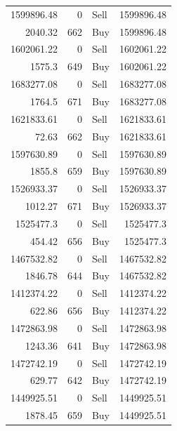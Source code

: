 \begin{longtable}{rrlr}
1599896.48 & 0 & Sell & 1599896.48 \\
2040.32 & 662 & Buy & 1599896.48 \\
1602061.22 & 0 & Sell & 1602061.22 \\
1575.3 & 649 & Buy & 1602061.22 \\
1683277.08 & 0 & Sell & 1683277.08 \\
1764.5 & 671 & Buy & 1683277.08 \\
1621833.61 & 0 & Sell & 1621833.61 \\
72.63 & 662 & Buy & 1621833.61 \\
1597630.89 & 0 & Sell & 1597630.89 \\
1855.8 & 659 & Buy & 1597630.89 \\
1526933.37 & 0 & Sell & 1526933.37 \\
1012.27 & 671 & Buy & 1526933.37 \\
1525477.3 & 0 & Sell & 1525477.3 \\
454.42 & 656 & Buy & 1525477.3 \\
1467532.82 & 0 & Sell & 1467532.82 \\
1846.78 & 644 & Buy & 1467532.82 \\
1412374.22 & 0 & Sell & 1412374.22 \\
622.86 & 656 & Buy & 1412374.22 \\
1472863.98 & 0 & Sell & 1472863.98 \\
1243.36 & 641 & Buy & 1472863.98 \\
1472742.19 & 0 & Sell & 1472742.19 \\
629.77 & 642 & Buy & 1472742.19 \\
1449925.51 & 0 & Sell & 1449925.51 \\
1878.45 & 659 & Buy & 1449925.51 \\
\end{longtable}
